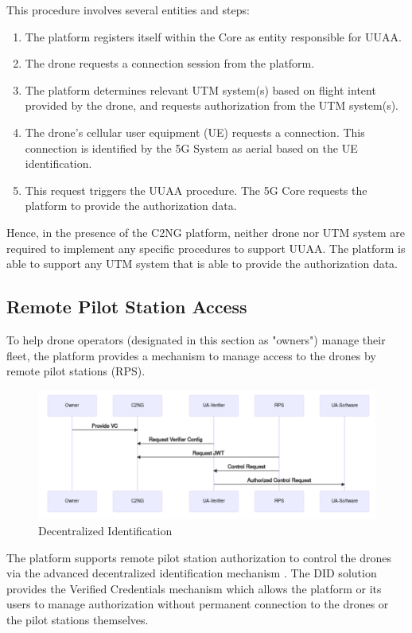 \documentclass[a4paper,conference]{IEEEtran}
\begin{document}
This procedure involves several entities and steps:

\begin{enumerate}
  \item The platform registers itself within the Core as entity responsible for UUAA.
  \item The drone requests a connection session from the platform.
  \item The platform determines relevant UTM system(s) based on flight intent provided by the drone, and requests authorization from the UTM system(s).
  \item The drone's cellular user equipment (UE) requests a connection. This connection is identified by the 5G System as aerial based on the UE identification.
  \item This request triggers the UUAA procedure. The 5G Core requests the platform to provide the authorization data.
\end{enumerate}

Hence, in the presence of the C2NG platform, neither drone nor UTM system are required to implement any specific procedures to support UUAA. The platform is able to support any UTM system that is able to provide the authorization data.

\subsection{Remote Pilot Station Access}
\label{section:did}

To help drone operators (designated in this section as "owners") manage their fleet, the platform provides a mechanism to manage access to the drones by remote pilot stations (RPS).

\begin{figure}[!ht]
\centering
\includegraphics[width=0.9\linewidth]{images/did.png}
\caption{Decentralized Identification}\label{fig:did}
\end{figure}

The platform supports remote pilot station authorization to control the drones via the advanced decentralized identification mechanism \cite{excid:did}. The DID solution provides the Verified Credentials mechanism which allows the platform or its users to manage authorization without permanent connection to the drones or the pilot stations themselves.
\end{document}

